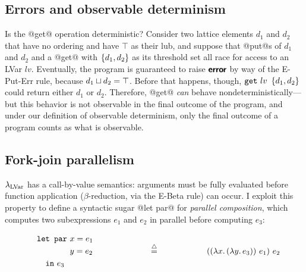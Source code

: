 \subsection{Errors and observable determinism}\label{subsection:lvars-errors-and-observable-determinism}

Is the @get@ operation deterministic?  Consider two lattice elements
$d_1$ and $d_2$ that have no ordering and have $\top$ as their lub,
and suppose that @put@s of $d_1$ and $d_2$ and a @get@ with
$\left\{d_1, d_2\right\}$ as its threshold set all race for access to an LVar
$lv$.  Eventually, the program is guaranteed to raise $\textbf{\textsf{error}}$ by way
of the {\sc E-Put-Err} rule, because $d_1 \sqcup d_2 = \top$.  Before
that happens, though, $\mbox{\texttt{get}}~lv~\left\{d_1, d_2\right\}$ could return
either $d_1$ or $d_2$.  Therefore, @get@ \emph{can} behave
nondeterministically---but this behavior is not observable in the
final outcome of the program, and under our definition of observable
determinism, only the final outcome of a program counts as what is
observable.

\subsection{Fork-join parallelism}\label{subsection:fork-join}

$\lambda_{\textrm{LVar}}$ has a call-by-value semantics: arguments must be fully
evaluated before function application ($\beta$-reduction, via the {\sc
  E-Beta} rule) can occur.  I exploit this property to define a
syntactic sugar @let par@ for \emph{parallel composition}, which
computes two subexpressions $e_1$ and $e_2$ in parallel before
computing $e_3$:

\singlespacing
\begin{displaymath}
\begin{minipage}[b]{2in}
  \begin{equation*}
\begin{split}
& \LETPAR ~x = e_1 \\ 
& \letparspace ~y = e_2 \\
& \letspace \IN~e_3 
\end{split}
\end{equation*}
\end{minipage}
\begin{minipage}[b]{1in}
\centering
$\defeq$
\end{minipage}
\begin{minipage}[b]{2in}
\begin{equation*}
  \app{(\app{(\lam{x}{(\lam{y}{e_3})})}{e_1})}{e_2}
\end{equation*}
\end{minipage}
\end{displaymath}
\doublespacing

